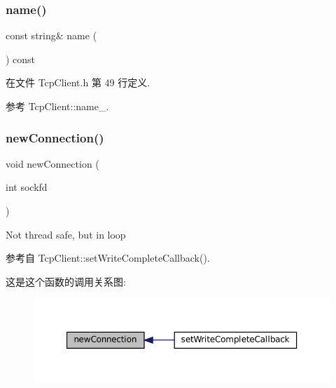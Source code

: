 \subsubsection{\texorpdfstring{name()}{name()}}
{\footnotesize\ttfamily const string\& name (\begin{DoxyParamCaption}{ }\end{DoxyParamCaption}) const\hspace{0.3cm}{\ttfamily [inline]}}



在文件 Tcp\+Client.\+h 第 49 行定义.



参考 Tcp\+Client\+::name\+\_\+.

\mbox{\label{classmuduo_1_1net_1_1TcpClient_ae2e5d102f7a519e65019cd5f09acea72}} 
\subsubsection{\texorpdfstring{new\+Connection()}{newConnection()}}
{\footnotesize\ttfamily void new\+Connection (\begin{DoxyParamCaption}\item[{int}]{sockfd }\end{DoxyParamCaption})\hspace{0.3cm}{\ttfamily [private]}}



Not thread safe, but in loop 



参考自 Tcp\+Client\+::set\+Write\+Complete\+Callback().

这是这个函数的调用关系图\+:
\nopagebreak
\begin{figure}[H]
\begin{center}
\leavevmode
\includegraphics[width=350pt]{classmuduo_1_1net_1_1TcpClient_ae2e5d102f7a519e65019cd5f09acea72_icgraph}
\end{center}
\end{figure}
\mbox{\label{classmuduo_1_1net_1_1TcpClient_ad9661c3f05443256c9439f812d1a7691}} 
